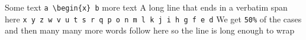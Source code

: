Some text \verb!a \begin{x} b! more text
A long line that ends in a verbatim span here \verb!x y z w v u t s r q p o n m l k j i h g f e d!
We get \verb=50%= of the cases and then many many more words follow here so the line is long enough to wrap
